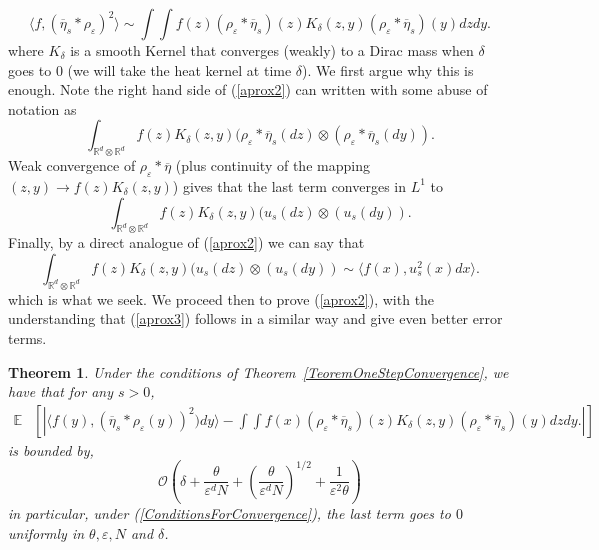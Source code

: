 \documentclass[a4paper,12pt]{article}
\newtheorem{theorem}{Theorem}[section]
\newcommand{\1}{{\bf {1}}}
\def\epsilon{\varepsilon}
\begin{document}
\begin{equation}
\label{aprox2}
\langle f, (\overline{\eta}_s * \rho_\epsilon)^2 \rangle \sim \int \int f(z) (\rho_\epsilon * \overline{\eta}_s)(z) K_\delta (z,y) (\rho_\epsilon * \overline{\eta}_s)(y) dz dy.
\end{equation}
where $K_\delta$ is a smooth Kernel that converges (weakly) to a Dirac mass when $\delta$ goes to $0$ (we will take the heat kernel at time $\delta$). We first argue why this is enough. Note the right hand side of (\ref{aprox2}) can written with some abuse of notation as
\[ \int_{\mathbb{R}^{d} \otimes \mathbb{R}^d} f(z) K_\delta(z,y) (\rho_\epsilon * \overline{\eta}_s(dz) \otimes (\rho_\epsilon * \overline{\eta}_s(dy)). \]
Weak convergence of $\rho_\epsilon * \overline{\eta}$ (plus continuity of the mapping $(z,y) \rightarrow f(z) K_\delta(z,y)$) gives that the last term converges in $L^1$ to
\[ \int_{\mathbb{R}^{d} \otimes \mathbb{R}^d} f(z) K_\delta(z,y) (u_s(dz) \otimes (u_s(dy)). \]
Finally, by a direct analogue of (\ref{aprox2}) we can say that
\begin{equation} \int_{\mathbb{R}^{d} \otimes \mathbb{R}^d} f(z) K_\delta(z,y) (u_s(dz) \otimes (u_s(dy)) \sim \langle f(x), u_s^2(x) dx \rangle. \label{aprox3} \end{equation}
which is what we seek. We proceed then to prove (\ref{aprox2}), with the understanding that (\ref{aprox3}) follows in a similar way and give even better error terms.
\begin{theorem}
Under the conditions of Theorem~\ref{TeoremOneStepConvergence}, we have that for any $s>0$,
\begin{align*}
\mathbb{E}&\left[\left| \langle f(y), (\overline{\eta}_s * \rho_\epsilon(y))^2) dy\rangle - \int \int f(x) (\rho_\epsilon * \overline{\eta}_s)(z) K_\delta (z,y) (\rho_\epsilon * \overline{\eta}_s)(y) dz dy. \right|\right]
\end{align*}
is bounded by,
\[  \mathcal{O}\left(\delta+\frac{\theta}{\epsilon^d N} + \left( \frac{\theta}{\epsilon^d N} \right)^{1/2} + \frac{1}{\epsilon^2 \theta} \right)  \]
in particular, under (\ref{ConditionsForConvergence}), the last term goes to $0$ uniformly in $\theta,\epsilon,N$ and $\delta$.
\end{theorem}
\end{document}
